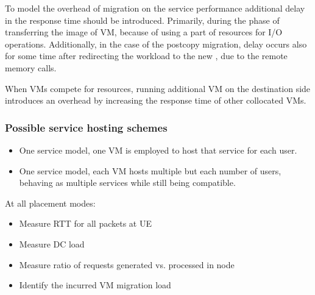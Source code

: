 
To model the overhead of migration on the service performance additional delay in the response time should be introduced.
Primarily, during the phase of transferring the image of VM, because of using a part of resources for I/O operations.
Additionally, in the case of the postcopy migration, delay occurs also for some time after redirecting the workload to the new \dc{}, due to the remote memory calls.

When VMs compete for resources, running additional VM on the destination side introduces an overhead by increasing the response time of other collocated VMs.  

\subsubsection{Possible service hosting schemes}

\begin{itemize}
\item One service model, one VM is employed to host that service for each user.
\item One service model, each VM hosts multiple but each number of users, behaving as multiple services while still being compatible.
\end{itemize}


At all placement modes:
\begin{itemize}
\item Measure RTT for all packets at UE
\item Measure DC load
\item Measure ratio of requests generated vs. processed in \xcloud node
\item Identify the incurred VM migration load
\end{itemize}